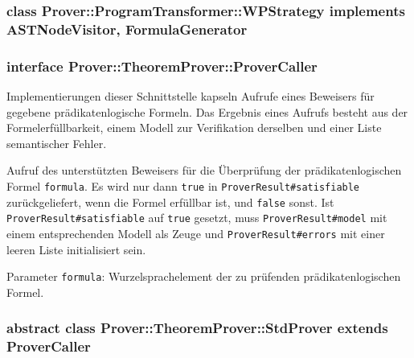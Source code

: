 \subsubsection{class Prover::ProgramTransformer::WPStrategy implements ASTNodeVisitor, FormulaGenerator}%


\begin{description}%

\end{description}%


\begin{description}%

\end{description}%

\subsubsection{interface Prover::TheoremProver::ProverCaller}%

Implementierungen dieser Schnittstelle kapseln Aufrufe eines Beweisers
für gegebene prädikatenlogische Formeln. Das Ergebnis eines Aufrufs
besteht aus der Formelerfüllbarkeit, einem Modell zur Verifikation
derselben und einer Liste semantischer Fehler.%


\begin{description}%

    Aufruf des unterstützten Beweisers für die Überprüfung der
    prädikatenlogischen Formel \texttt{formula}. Es wird nur dann
    \texttt{true} in \texttt{ProverResult\#satisfiable}
    zurückgeliefert, wenn die Formel erfüllbar ist, und \texttt{false}
    sonst. Ist \texttt{ProverResult\#satisfiable} auf \texttt{true}
    gesetzt, muss \texttt{ProverResult\#model} mit einem
    entsprechenden Modell als Zeuge und \texttt{ProverResult\#errors}
    mit einer leeren Liste initialisiert sein.%

    Parameter \texttt{formula}: Wurzelsprachelement der zu prüfenden
    prädikatenlogischen Formel.%

\end{description}%

\subsubsection{abstract class Prover::TheoremProver::StdProver extends ProverCaller}%

